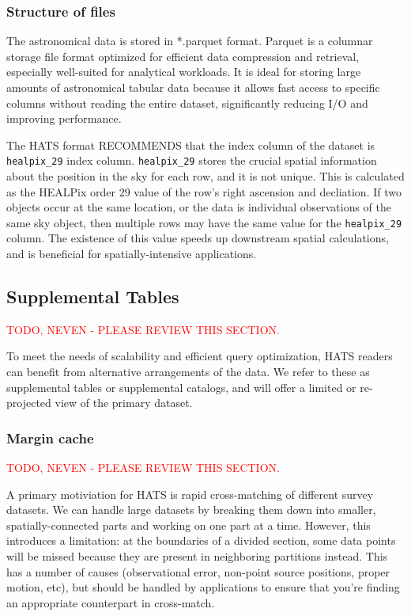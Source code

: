 \documentclass[11pt,a4paper]{ivoa}
\begin{document}
     \subsubsection{Structure of files} \label{sec:parquet}
The astronomical data is stored in *.parquet format. Parquet is a columnar storage file format optimized for efficient data compression and retrieval, especially well-suited for analytical workloads. It is ideal for storing large amounts of astronomical tabular data because it allows fast access to specific columns without reading the entire dataset, significantly reducing I/O and improving performance. \par
The HATS format RECOMMENDS that the index column of the dataset is \texttt{healpix\_29} index column.  \texttt{healpix\_29} stores the crucial spatial information about the position in the sky for each row, and it is not unique.
This is calculated as the HEALPix order 29 value of the row's right ascension and decliation. If two objects occur at the same location, or the data is individual observations of the same sky object, then multiple rows may have the same value for the \texttt{healpix\_29} column.
The existence of this value speeds up downstream spatial calculations, and is beneficial for spatially-intensive applications.

\subsection{Supplemental Tables} \label{sec:supplemental}

\textcolor{red}{TODO, NEVEN - PLEASE REVIEW THIS SECTION.}

To meet the needs of scalability and efficient query optimization, HATS readers can benefit from alternative arrangements of the data. 
We refer to these as supplemental tables or supplemental catalogs, and will offer a limited or re-projected view of the primary dataset.

\subsubsection{Margin cache} \label{sec:margin}

\textcolor{red}{TODO, NEVEN - PLEASE REVIEW THIS SECTION.}

A primary motiviation for HATS is rapid cross-matching of different survey datasets. 
We can handle large datasets by breaking them down into smaller, spatially-connected parts and working on one part at a time.
However, this introduces a limitation: at the boundaries of a divided section, some data points will be missed because they are present in neighboring partitions instead.
This has a number of causes (observational error, non-point source positions, proper motion, etc), but should be handled by applications to ensure that you're finding an appropriate counterpart in cross-match.\par
\end{document}
